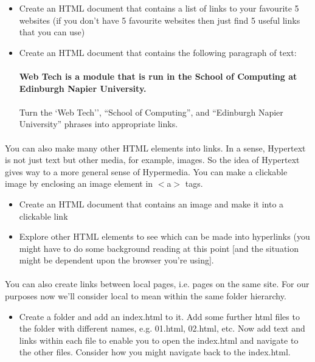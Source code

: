 \documentclass[10pt, a4paper, twosize]{article}
\begin{document}
\begin{itemize}
\item Create an HTML document that contains a list of links to your favourite 5 websites (if you don't have 5 favourite websites then just find 5 useful links that you can use)
\item Create an HTML document that contains the following paragraph of text:\\\\
{\textbf{Web Tech is a module that is run in the School of Computing at Edinburgh Napier University.}}\\\\
Turn the `Web Tech'', ``School of Computing'', and ``Edinburgh Napier University'' phrases into appropriate links.
\end{itemize}

\paragraph{} You can also make many other HTML elements into links. In a sense, Hypertext is not just text but other media, for example, images. So the idea of Hypertext gives way to a more general sense of Hypermedia. You can make a clickable image by enclosing an image element in $<$a$>$ tags.

\begin{itemize}
\item Create an HTML document that contains an image and make it into a clickable link
\item Explore other HTML elements to see which can be made into hyperlinks (you might have to do some background reading at this point [and the situation might be dependent upon the browser you're using].
\end{itemize}

\paragraph{} You can also create links between local pages, i.e. pages on the same site. For our purposes now we'll consider local to mean within the same folder hierarchy. 
\begin{itemize}
\item Create a folder and add an index.html to it. Add some further html files to the folder with different names, e.g. 01.html, 02.html, etc. Now add text and links within each file to enable you to open the index.html and navigate to the other files. Consider how you might navigate back to the index.html. 
\end{itemize}
\end{document}
